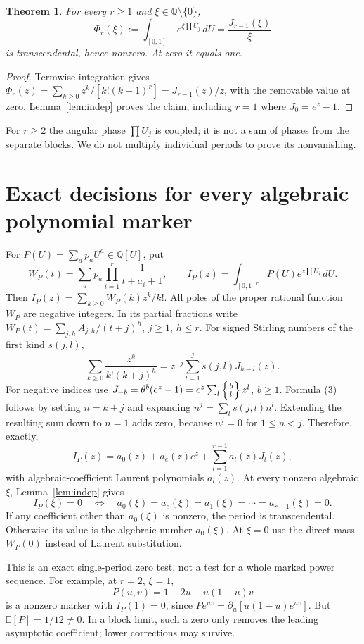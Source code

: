 \documentclass[11pt]{article}
\newtheorem{theorem}{Theorem}
\newcommand{\Qb}{\overline{\mathbb Q}}
\newcommand{\E}{\mathbb E}
\newcommand{\fall}[2]{#1^{\underline{#2}}}
\begin{document}
\begin{theorem}\label{thm:product}
For every $r\geq1$ and $\xi\in\Qb\setminus\{0\}$,
\[
 \Phi_r(\xi):=\int_{[0,1]^r}e^{\xi\prod U_j}\,dU
       =\frac{J_{r-1}(\xi)}{\xi}
\]
is transcendental, hence nonzero. At zero it equals one.
\end{theorem}
\begin{proof}
Termwise integration gives
$\Phi_r(z)=\sum_{k\geq0}z^k/[k!(k+1)^r]=J_{r-1}(z)/z$,
with the removable value at zero. Lemma~\ref{lem:indep} proves the claim,
including $r=1$ where $J_0=e^z-1$.
\end{proof}
For $r\geq2$ the angular phase $\prod U_j$ is coupled; it is not a sum
of phases from the separate blocks. We do not multiply individual
periods to prove its nonvanishing.

\section{Exact decisions for every algebraic polynomial marker}
For $P(U)=\sum_a p_aU^a\in\Qb[U]$, put
\[
 W_P(t)=\sum_a p_a\prod_{i=1}^r\frac1{t+a_i+1},\qquad
 I_P(z)=\int_{[0,1]^r}P(U)e^{z\prod U_i}\,dU.
\]
Then $I_P(z)=\sum_{k\geq0}W_P(k)z^k/k!$.
All poles of the proper rational function $W_P$ are negative integers.
In its partial fractions write
$W_P(t)=\sum_{j,h}A_{j,h}/(t+j)^h$, $j\geq1$, $h\leq r$.
For signed Stirling numbers of the first kind $s(j,l)$,
\[
 \sum_{k\geq0}\frac{z^k}{k!(k+j)^h}
   =z^{-j}\sum_{l=1}^j s(j,l)J_{h-l}(z).             \tag{3}
\]
For negative indices use $J_{-b}=\theta^b(e^z-1)
=e^z\sum_l\left\{{b\atop l}\right\}z^l$, $b\geq1$.
Formula (3) follows by setting $n=k+j$ and expanding
$\fall nj=\sum_l s(j,l)n^l$. Extending the resulting sum down to $n=1$
adds zero, because $\fall nj=0$ for $1\leq n<j$.
Therefore, exactly,
\[
 I_P(z)=a_0(z)+a_e(z)e^z+\sum_{l=1}^{r-1}a_l(z)J_l(z),             \tag{4}
\]
with algebraic-coefficient Laurent polynomials $a_l(z)$.
At every nonzero algebraic $\xi$, Lemma~\ref{lem:indep} gives
\[
 I_P(\xi)=0\quad\Longleftrightarrow\quad
       a_0(\xi)=a_e(\xi)=a_1(\xi)=\cdots=a_{r-1}(\xi)=0.          \tag{5}
\]
If any coefficient other than $a_0(\xi)$ is nonzero, the period is
transcendental. Otherwise its value is the algebraic number $a_0(\xi)$.
At $\xi=0$ use the direct mass $W_P(0)$ instead of Laurent substitution.

This is an exact single-period zero test, not a test for a whole marked
power sequence. For example, at $r=2$, $\xi=1$,
\[
 P(u,v)=1-2u+u(1-u)v
\]
is a nonzero marker with $I_P(1)=0$, since
$P e^{uv}=\partial_u[u(1-u)e^{uv}]$. But $\E[P]=1/12\ne0$.
In a block limit, such a zero only removes the leading asymptotic
coefficient; lower corrections may survive.
\end{document}
